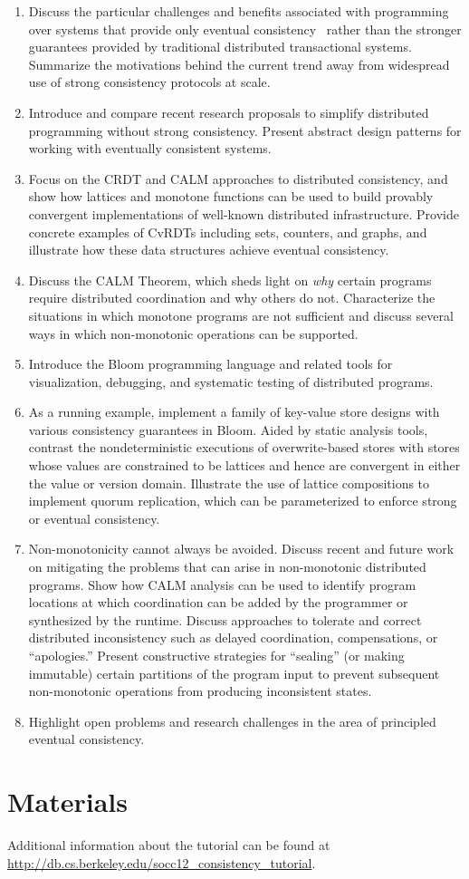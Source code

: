\begin{enumerate}
\item
  Discuss the particular challenges and benefits associated with programming
  over systems that provide only eventual
  consistency~\cite{DeCandia2007,Terry1995,vogels} rather than the stronger
  guarantees provided by traditional distributed transactional systems.
  Summarize the motivations behind the current trend away from widespread use of
  strong consistency protocols at scale.
\item
  Introduce and compare recent research proposals to simplify distributed
  programming without strong consistency.  Present abstract design patterns
  for working with eventually consistent systems.
\item
  Focus on the CRDT and CALM approaches to distributed consistency, and show how
  lattices and monotone functions can be used to build provably convergent
  implementations of well-known distributed infrastructure.  Provide concrete
  examples of CvRDTs including sets, counters, and graphs, and illustrate how
  these data structures achieve eventual consistency.
\item
  Discuss the CALM Theorem, which sheds light on \emph{why} certain programs
  require distributed coordination and why others do not.  Characterize the
  situations in which monotone programs are not sufficient and discuss several
  ways in which non-monotonic operations can be supported.
\item
  Introduce the Bloom programming language and related tools for visualization,
  debugging, and systematic testing of distributed programs.
\item
  As a running example, implement a family of key-value store designs with
  various consistency guarantees in Bloom.  Aided by static analysis tools,
  contrast the nondeterministic executions of overwrite-based stores with stores
  whose values are constrained to be lattices and hence are convergent in
  either the value or version domain.  Illustrate the use of lattice
  compositions to implement quorum replication, which can be parameterized to
  enforce strong or eventual consistency.
\item
  Non-monotonicity cannot always be avoided.  Discuss recent and future work on
  mitigating the problems that can arise in non-monotonic distributed programs.
  Show how CALM analysis can be used to identify program locations at which
  coordination can be added by the programmer or synthesized by the runtime.
  Discuss approaches to tolerate and correct distributed inconsistency such as
  delayed coordination, compensations, or ``apologies.''  Present constructive
  strategies for ``sealing'' (or making immutable) certain partitions of the
  program input to prevent subsequent non-monotonic operations from producing
  inconsistent states.
\item
  Highlight open problems and research challenges in the area of principled
  eventual consistency.
\end{enumerate}

\section{Materials}
Additional information about the tutorial can be found at
\url{http://db.cs.berkeley.edu/socc12_consistency_tutorial}.





